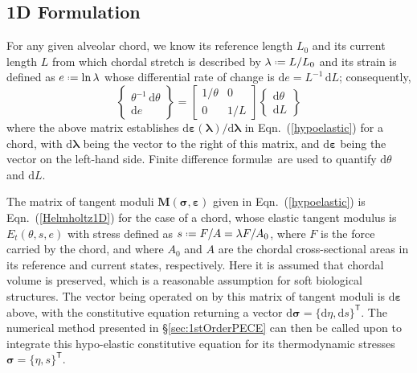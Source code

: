 \subsection{1D Formulation}

For any given alveolar chord, we know its reference length $L_0$ and its current length $L$ from which chordal stretch is described by $\lambda \defeq L / L_0$ and its strain is defined as $e \defeq \ln \lambda$ whose differential rate of change is $\mathrm{d} e = L^{-1} \, \mathrm{d} L$; consequently,
\begin{equation}
    \left\{ \begin{matrix}
    \theta^{-1} \, \mathrm{d} \theta \\ \mathrm{d} e
    \end{matrix} \right\} = \begin{bmatrix}
    1 / \theta & 0 \\ 0 & 1/L
    \end{bmatrix} \left\{ \begin{matrix}
    \mathrm{d} \theta \\ \mathrm{d} L
    \end{matrix} \right\}
\end{equation}
where the above matrix establishes $\mathrm{d} \boldsymbol{\varepsilon} ( \boldsymbol{\lambda} ) / \mathrm{d} \boldsymbol{\lambda}$ in Eqn.~(\ref{hypoelastic}) for a chord, with $\mathrm{d} \boldsymbol{\lambda}$ being the vector to the right of this matrix, and $\mathrm{d} \boldsymbol{\varepsilon}$ being the vector on the left-hand side.  Finite difference formul\ae\ are used to quantify $\mathrm{d} \theta$ and $\mathrm{d} L$.

The matrix of tangent moduli $\mathbf{M} ( \boldsymbol{\sigma} , \boldsymbol{\varepsilon} )$ given in Eqn.~(\ref{hypoelastic}) is Eqn.~(\ref{Helmholtz1D}) for the case of a chord, whose elastic tangent modulus is $E_t (\theta , s , e)$ with stress defined as $s \defeq F/A = \lambda F / A_0$, where $F$ is the force carried by the chord, and where $A_0$ and $A$ are the chordal cross-sectional areas in its reference and current states, respectively.  Here it is assumed that chordal volume is preserved, which is a reasonable assumption for soft biological structures.  The vector being operated on by this matrix of tangent moduli is $\mathrm{d} \boldsymbol{\varepsilon}$ above, with the constitutive equation returning a vector $\mathrm{d} \boldsymbol{\sigma} = \{ \mathrm{d} \eta , \mathrm{d} s \}^{\mathsf{T}}$.  The numerical method presented in \S\ref{sec:1stOrderPECE} can then be called upon to integrate this hypo-elastic constitutive equation for its thermo\-dynamic stresses $\boldsymbol{\sigma} = \{ \eta , s \}^{\mathsf{T}}$.  



